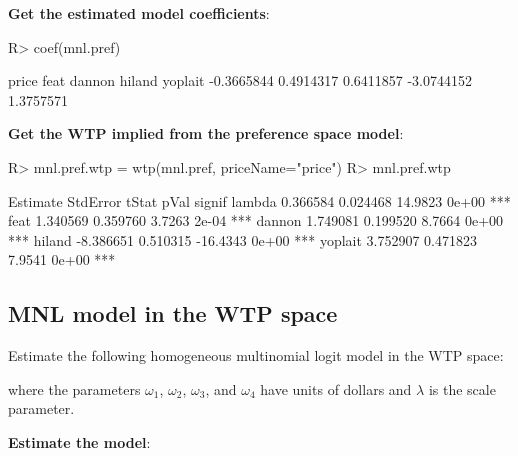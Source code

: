 \documentclass[article]{jss}
\begin{document}
\textbf{Get the estimated model coefficients}:

\begin{CodeChunk}

\begin{CodeInput}
R> coef(mnl.pref)
\end{CodeInput}

\begin{CodeOutput}
     price       feat     dannon     hiland    yoplait 
-0.3665844  0.4914317  0.6411857 -3.0744152  1.3757571 
\end{CodeOutput}
\end{CodeChunk}

\textbf{Get the WTP implied from the preference space model}:

\begin{CodeChunk}

\begin{CodeInput}
R> mnl.pref.wtp = wtp(mnl.pref, priceName="price")
R> mnl.pref.wtp
\end{CodeInput}

\begin{CodeOutput}
         Estimate StdError    tStat  pVal signif
lambda   0.366584 0.024468  14.9823 0e+00    ***
feat     1.340569 0.359760   3.7263 2e-04    ***
dannon   1.749081 0.199520   8.7664 0e+00    ***
hiland  -8.386651 0.510315 -16.4343 0e+00    ***
yoplait  3.752907 0.471823   7.9541 0e+00    ***
\end{CodeOutput}
\end{CodeChunk}

\hypertarget{mnl-model-in-the-wtp-space}{%
\subsection{MNL model in the WTP
space}\label{mnl-model-in-the-wtp-space}}

Estimate the following homogeneous multinomial logit model in the WTP
space:



where the parameters \(\omega_1\), \(\omega_2\), \(\omega_3\), and
\(\omega_4\) have units of dollars and \(\lambda\) is the scale
parameter.

\textbf{Estimate the model}:
\end{document}

